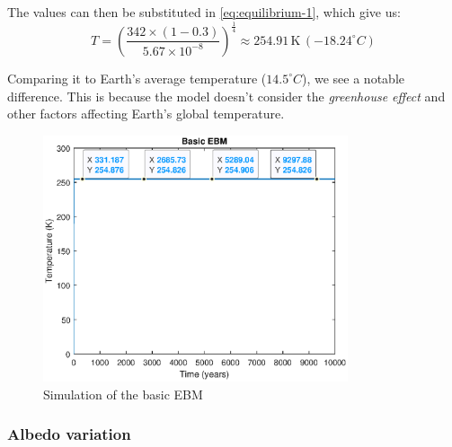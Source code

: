 \documentclass[12pt]{article}
\begin{document}
\noindent The values can then be substituted in \ref{eq:equilibrium-1}, which give us:
\begin{equation}
    T = \left( \frac{342 \times (1 - 0.3)}{5.67 \times 10^{-8}} \right)^{\frac{1}{4}} \approx 254.91 \, \text{K} \, ({-18.24}^\circ C)
\end{equation}

Comparing it to Earth's average temperature (${14.5}^\circ C$), we see a notable difference. This is because the model doesn't consider the \textit{greenhouse effect} and other factors affecting Earth's global temperature.

\begin{figure}[!hbt]
    \centering
    \includegraphics[width=0.8\textwidth]{images/ebm_basic.eps}
    \caption{Simulation of the basic EBM}
    \label{fig:basic_ebm}
\end{figure}


\subsubsection{Albedo variation}
\end{document}

